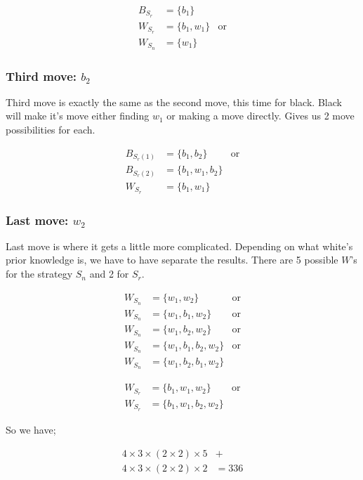 \begin{align}
	B_{S_r} &= \{b_1\}\nonumber \\
	W_{S_r} &= \{b_1, w_1\} &\text{or}\nonumber \\
	W_{S_n} &= \{w_1\} \nonumber
\end{align}

\subsubsection*{Third move: $b_2$}
Third move is exactly the same as the second move, this time for black. Black will make it's move either finding $w_1$ or making a move directly. Gives us 2 move possibilities for each.

\begin{align}
	B_{S_r(1)} &= \{b_1, b_2\} &\text{or} \nonumber\\
	B_{S_r(2)} &= \{b_1, w_1, b_2\} \nonumber\\
	W_{S_r} &= \{b_1, w_1\} \nonumber
\end{align}

\subsubsection*{Last move: $w_2$}
Last move is where it gets a little more complicated. Depending on what white's prior knowledge is, we have to have separate the results. There are 5 possible $W$'s for the strategy $S_n$ and 2 for $S_r$.

\begin{align}
	W_{S_n} &= \{w_1, w_2\} &\text{or}\nonumber\\
	W_{S_n} &= \{w_1, b_1, w_2\} &\text{or}\nonumber\\
	W_{S_n} &= \{w_1, b_2, w_2\} &\text{or}\nonumber\\
	W_{S_n} &= \{w_1, b_1, b_2, w_2\} &\text{or}\nonumber\\
	W_{S_n} &= \{w_1, b_2, b_1, w_2\} \nonumber
\end{align}

\begin{align}
	W_{S_r} &= \{b_1, w_1, w_2\}&\text{or}\nonumber\\
	W_{S_r} &= \{b_1, w_1, b_2, w_2\} \nonumber
\end{align}

So we have; 

\begin{align}
	4\times3\times(2\times2)\times5 &+ \nonumber\\ 4\times3\times(2\times2)\times2 &= 336 \nonumber
\end{align}

